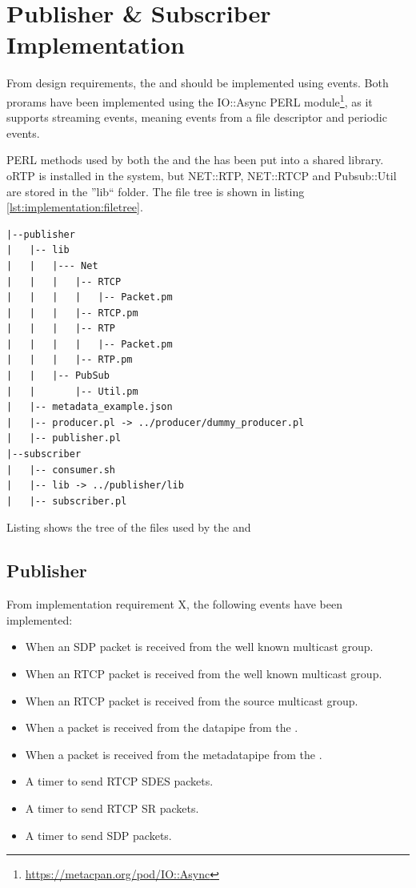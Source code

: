 \section{Publisher \& Subscriber Implementation} \label{sec:implementation:implpubsub}
From design requirements, the \pub{} and \sub{} should be implemented using events. Both prorams have been implemented using the IO::Async PERL module\footnote{\url{https://metacpan.org/pod/IO::Async}}, as it supports streaming events, meaning events from a file descriptor and periodic events.

\noindent{}PERL methods used by both the \sub{} and the \pub{} has been put into a shared library. oRTP is installed in the system, but  NET::RTP, NET::RTCP and Pubsub::Util are stored in the ''lib`` folder. The file tree is shown in listing \ref{lst:implementation:filetree}.

\begin{listing}[H] 
	\begin{verbatim}
|--publisher
|   |-- lib
|   |   |--- Net
|   |   |   |-- RTCP
|   |   |   |   |-- Packet.pm
|   |   |   |-- RTCP.pm
|   |   |   |-- RTP
|   |   |   |   |-- Packet.pm
|   |   |   |-- RTP.pm
|   |   |-- PubSub
|   |       |-- Util.pm
|   |-- metadata_example.json
|   |-- producer.pl -> ../producer/dummy_producer.pl
|   |-- publisher.pl
|--subscriber
|   |-- consumer.sh
|   |-- lib -> ../publisher/lib
|   |-- subscriber.pl
\end{verbatim}
\caption{Listing shows the tree of the files used by the \sub{} and \pub{}}
\label{lst:implementation:filetree}
\end{listing}

\subsection{Publisher}
From implementation requirement X, the following events have been implemented:
\begin{itemize}
	\item When an SDP packet is received from the well known multicast group.
	\item When an RTCP packet is received from the well known multicast group.
	\item When an RTCP packet is received from the source multicast group.
	\item When a packet is received from the datapipe from the \pro{}.
	\item When a packet is received from the metadatapipe from the \pro{}.
	\item A timer to send RTCP SDES packets.
	\item A timer to send RTCP SR packets.
	\item A timer to send SDP packets.
\end{itemize}

